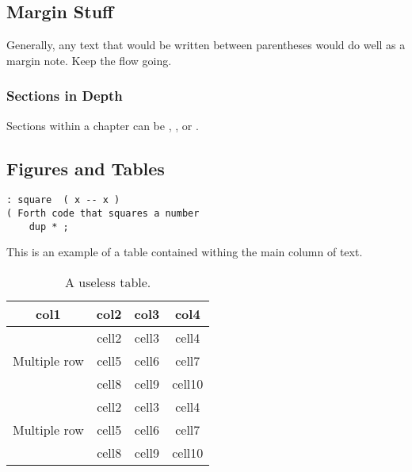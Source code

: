 %
\subsection{Margin Stuff}
Generally, any text that would be written between parentheses would do well as
a margin note. Keep the flow going.


%
%
\subsubsection{Sections in Depth}
Sections within a chapter can be , , or
.

%
\subsection{Figures and Tables}
\begin{lstlisting}[caption={
This Forth code does NOT generate \reftab{useless}
}]
: square  ( x -- x )
( Forth code that squares a number
    dup * ;
\end{lstlisting}

This is an example of a table contained withing the main column of text.

\begin{table}[ht]
\caption[A useless table]{A useless table.}
\begin{tabular}{ c c c c }
    \toprule
    col1          & col2  & col3  & col4\\
    \midrule
    \multirow{3}{4em}{
    Multiple row} & 
        cell2 & cell3 & cell4\\ &
        cell5 & cell6 & cell7 \\ &
        cell8 & cell9 & cell10 \\
    \multirow{3}{4em}{
    Multiple row} & 
        cell2 & cell3 & cell4 \\ &
        cell5 & cell6 & cell7 \\ &
        cell8 & cell9 & cell10 \\
    \bottomrule
\end{tabular}
\end{table}



